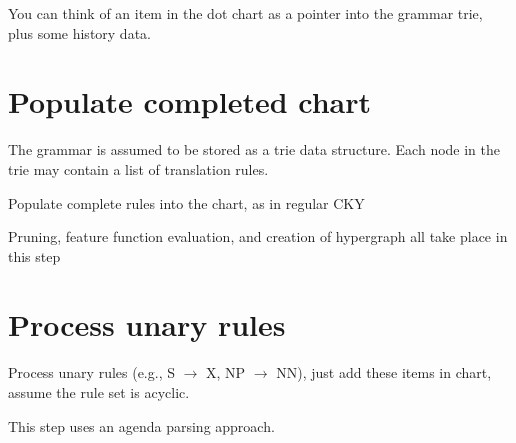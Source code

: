 You can think of an item in the dot chart as a pointer into the grammar trie, plus some history data.


\section{Populate completed chart}

The grammar is assumed to be stored as a trie data structure. Each node in the trie may contain a list of translation rules.

Populate complete rules into the chart, as in regular CKY

Pruning, feature function evaluation, and creation of hypergraph all take place in this step



\section{Process unary rules}

Process unary rules (e.g., S $\rightarrow$ X, NP $\rightarrow$ NN), just add these items in chart, assume the rule set is acyclic.

This step uses an agenda parsing approach.


\section{}

